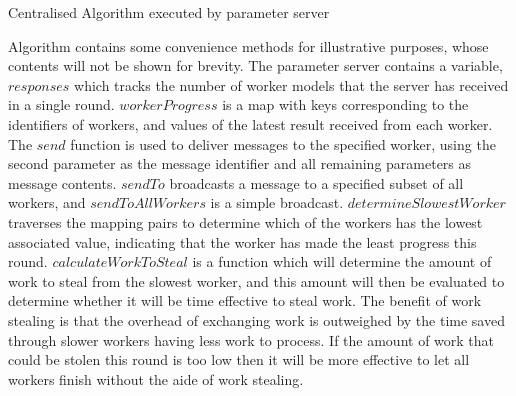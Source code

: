 \documentclass[12pt]{article}
\begin{document}
\IncMargin{1em}
\begin{algorithm}[H]
 \BlankLine
 \BlankLine
 \BlankLine
 \setcounter{AlgoLine}{0}
 \BlankLine
 \BlankLine
 \BlankLine
 \caption{Centralised Algorithm executed by parameter server}
 \label{CentralisedAlgorithmServer}
\end{algorithm}
\DecMargin{1em}
\medskip

Algorithm contains some convenience methods for illustrative purposes, whose contents will not be shown for brevity. The parameter server contains a variable, $responses$ which tracks the number of worker models that the server has received in a single round. $workerProgress$ is a map with keys corresponding to the identifiers of workers, and values of the latest result received from each worker.
\newline
The $send$ function is used to deliver messages to the specified worker, using the second parameter as the message identifier and all remaining parameters as message contents. $sendTo$ broadcasts a message to a specified subset of all workers, and $sendToAllWorkers$ is a simple broadcast.
\newline
$determineSlowestWorker$ traverses the mapping pairs to determine which of the workers has the lowest associated value, indicating that the worker has made the least progress this round. $calculateWorkToSteal$
is a function which will determine the amount of work to steal from the slowest worker, and this amount will then be evaluated to determine whether it will be time effective to steal work. The benefit of work stealing is that the overhead of exchanging work is outweighed by the time saved through slower workers having less work to process. If the amount of work that could be stolen this round is too low then it will be more effective to let all workers finish without the aide of work stealing.
\end{document}

